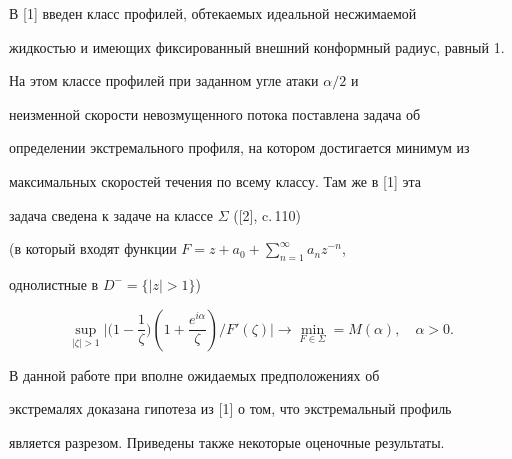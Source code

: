 \pagestyle{plain} %













\maketitle


\label{begin}





В [1] введен класс профилей, обтекаемых идеальной несжимаемой


жидкостью и имеющих фиксированный внешний конформный радиус, равный 1.


На этом классе профилей при заданном угле атаки $\alpha/2$ и


неизменной скорости невозмущенного потока поставлена задача об


определении экстремального профиля, на котором достигается минимум из


максимальных скоростей течения по всему классу. Там же в [1] эта


задача сведена к задаче на классе $ \Sigma $ ([2], c.\,110)


(в который входят функции $F= z+a_0+\sum\limits_{n=1}^{\infty}a_nz^{-n}$,


однолистные в $D^- = \{ |z|>1\}$)


\begin{equation}


\sup_{|\zeta|>1}\bigg|\bigg(1-\frac{1}{\zeta}\bigg)


(1+\frac{e^{i\alpha}}{\zeta})/


{F'(\zeta)}\bigg| \to \min_{F \in \Sigma} = M(\alpha), \quad \alpha >0.


\end{equation}





В данной работе при вполне ожидаемых предположениях об


экстремалях доказана гипотеза из [1] о том, что экстремальный профиль


является разрезом. Приведены также некоторые оценочные результаты.








